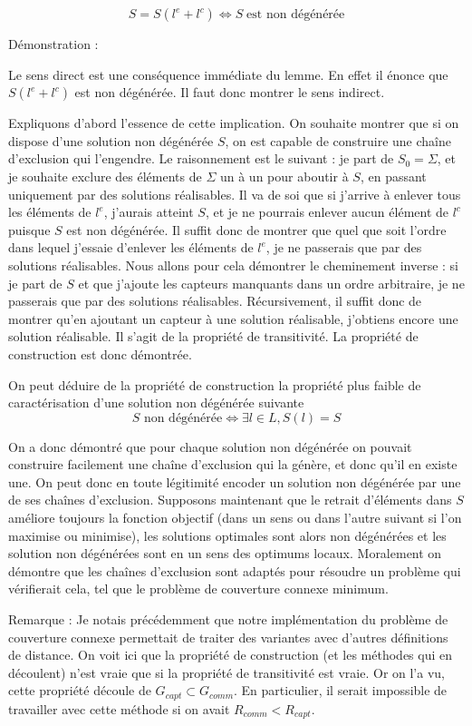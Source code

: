 \documentclass[12pt,a4paper]{article}
\begin{document}
\[S=S(l^e+l^c) \Leftrightarrow S\;\text{est non dégénérée}\]


Démonstration :

Le sens direct est une conséquence immédiate du lemme. En effet il énonce que $S(l^e+l^c)$ est non dégénérée. Il faut donc montrer le sens indirect.

Expliquons d'abord l'essence de cette implication. On souhaite montrer que si on dispose d'une solution non dégénérée $S$, on est capable de construire une chaîne d'exclusion qui l'engendre. Le raisonnement est le suivant : je part de $S_0=\Sigma$, et je souhaite exclure des éléments de $\Sigma$ un à un pour aboutir à $S$, en passant uniquement par des solutions réalisables. Il va de soi que si j'arrive à enlever tous les éléments de $l^e$, j'aurais atteint $S$, et je ne pourrais enlever aucun élément de $l^c$ puisque $S$ est non dégénérée. Il suffit donc de montrer que quel que soit l'ordre dans lequel j'essaie d'enlever les éléments de $l^e$, je ne passerais que par des solutions réalisables. Nous allons pour cela démontrer le cheminement inverse :  si je part de $S$ et que j'ajoute les capteurs manquants dans un ordre arbitraire, je ne passerais que par des solutions réalisables. Récursivement, il suffit donc de montrer qu'en ajoutant un capteur à une solution réalisable, j'obtiens encore une solution réalisable. Il s'agit de la propriété de transitivité. La propriété de construction est donc démontrée.

On peut déduire de la propriété de construction la propriété plus faible de caractérisation d'une solution non dégénérée suivante
\[S\text{ non dégénérée} \Leftrightarrow \exists l\in L, S(l)=S\]

On a donc démontré que pour chaque solution non dégénérée on pouvait construire facilement une chaîne d'exclusion qui la génère, et donc qu'il en existe une. On peut donc en toute légitimité encoder un solution non dégénérée par une de ses chaînes d'exclusion. Supposons maintenant que le retrait d'éléments dans $S$ améliore toujours la fonction objectif (dans un sens ou dans l'autre suivant si l'on maximise ou minimise), les solutions optimales sont alors non dégénérées et les solution non dégénérées sont en un sens des optimums locaux. Moralement on démontre que les chaînes d'exclusion sont adaptés pour résoudre un problème qui vérifierait cela, tel que le problème de couverture connexe minimum.  


Remarque : Je notais précédemment que notre implémentation du problème de couverture connexe permettait de traiter des variantes avec d'autres définitions de distance. On voit ici que la propriété de construction (et les méthodes qui en découlent) n'est vraie que si la propriété de transitivité est vraie. Or on l'a vu, cette propriété découle de $G_{capt}\subset G_{comm}$. En particulier, il serait impossible de travailler avec cette méthode si on avait $R_{comm}<R_{capt}$.
\end{document}
